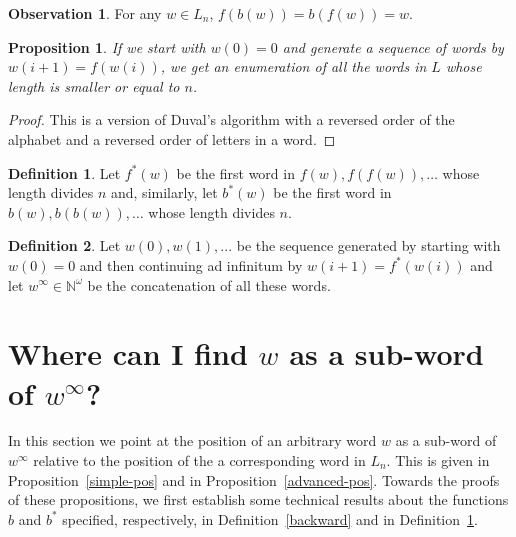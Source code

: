 \documentclass{article}
\newtheorem{proposition}[theorem]{Proposition}
\theoremstyle{definition}
\newtheorem{definition}{Definition}
\newtheorem{observation}[theorem]{Observation}
\newcommand{\N}{{\mathbb{N}}}
\begin{document}
\begin{observation}
	For any $w\in L_n$, $f(b(w))=b(f(w))=w$.
\end{observation}



\begin{proposition}
	If we start with $w(0)=0$ and generate a sequence of words by $w({i+1})=f(w(i))$, we get an enumeration of all the words in $L$ whose length is smaller or equal to $n$.
\end{proposition}
\begin{proof}
	This is a version of Duval's algorithm with a reversed order of the alphabet and a reversed order of letters in a word. 
\end{proof}

\begin{definition} \label{star-functions}
	Let $f^*(w)$ be the first word in ${f(w),f(f(w)),\dots}$ whose length divides $n$ and, similarly, let $b^*(w)$ be the first word in ${b(w),b(b(w)),\dots}$ whose length divides $n$. 
\end{definition}


\begin{definition}
	Let $w(0),w(1),...$ be the sequence generated by starting with $w(0)=0$ and then continuing ad infinitum by $w{(i+1)}=f^*(w(i))$ and let $w^\infty\in \N^\omega$ be the concatenation of all these words.
\end{definition}



\section{Where can I find $w$ as a sub-word of $w^\infty$?}

In this section we point at the position of an arbitrary word $w$ as a sub-word of  $w^\infty$ relative to the position of the a corresponding word in $L_n$. This is given in Proposition~\ref{simple-pos} and in Proposition~\ref{advanced-pos}. Towards the proofs of these propositions, we first establish some technical results about the functions $b$ and $b^*$ specified, respectively, in Definition~\ref{backward} and in Definition~\ref{star-functions}.
\end{document}
